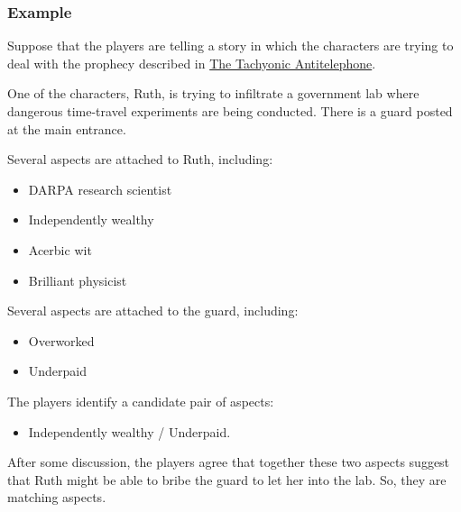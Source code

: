 \documentclass[12pt, a5paper, parskip=half-]{scrartcl}
\begin{document}
\subsubsection*{Example} \label{example:matching-aspects}
Suppose that the players are telling a story in which the characters are trying to deal with the prophecy described in \hyperref[subsection:the-tachyonic-antitelephone]{\cinzel \small The Tachyonic Antitelephone}. 

One of the characters, Ruth,  is trying to infiltrate a government lab where dangerous time-travel experiments are being conducted.  There is a guard posted at the main entrance.

Several aspects are attached to Ruth, including:\vspace{-1.75ex}
\begin{multicols}{2}
\begin{itemize}[noitemsep,nolistsep,  leftmargin=0.68cm]
  \item DARPA research scientist
  \item Independently wealthy
  \item Acerbic wit
  \item Brilliant physicist
\end{itemize}
\end{multicols}
\vspace{-2ex}
Several aspects are attached to the guard, including:\vspace{-1.75ex}
\begin{multicols}{2}
\begin{itemize}[noitemsep,nolistsep,  leftmargin=0.68cm]
	\item Overworked
	\item Underpaid
\end{itemize}
\end{multicols}
\vspace{-2ex}
The players identify a candidate pair of aspects:
\begin{itemize}[leftmargin=0.68cm, noitemsep,topsep=-1ex]
	\item Independently wealthy / Underpaid.
\end{itemize}
\vspace{1ex}

After some discussion, the players agree that together these two aspects suggest that Ruth might be able to bribe the guard to let her into the lab.  So, they are matching aspects.

\newpage
\end{document}
